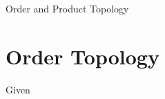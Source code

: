
\begin{chapter}{Order and Product Topology}
    \section{Order Topology}
    Given
    
\end{chapter}